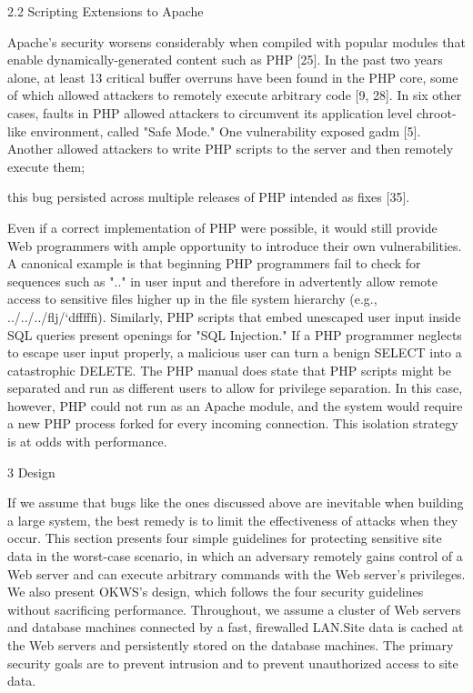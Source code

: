 2.2 Scripting Extensions to Apache

Apache's security worsens considerably when compiled with popular modules that
enable dynamically-generated content such as PHP [25].
In the past two years alone, at least 13 critical buffer overruns have been
found in the PHP core, some of which allowed attackers to remotely execute
arbitrary code [9, 28].
In six other cases, faults in PHP allowed attackers to circumvent its
application level chroot-like environment, called "Safe Mode." 
One vulnerability exposed gadm [5].
Another allowed attackers to write PHP scripts to the server and then remotely
execute them;

this bug persisted across multiple releases of PHP intended as fixes [35].

Even if a correct implementation of PHP were possible, it would still provide
Web programmers with ample opportunity to introduce their own vulnerabilities.
A canonical example is that beginning PHP programmers fail to check for
sequences such as ".." in user input and therefore in advertently allow remote
access to sensitive files higher up in the file system hierarchy
(e.g., ../../../\Phi flj/`dfffffi\Delta ). 
Similarly, PHP scripts that embed unescaped user input inside SQL queries
present openings for "SQL Injection." 
If a PHP programmer neglects to escape user input properly, a malicious user can
turn a benign SELECT into a catastrophic DELETE.
The PHP manual does state that PHP scripts might be separated and run as
different users to allow for privilege separation.
In this case, however, PHP could not run as an Apache module, and the system
would require a new PHP process forked for every incoming connection.
This isolation strategy is at odds with performance.

3 Design

If we assume that bugs like the ones discussed above are inevitable when
building a large system, the best remedy is to limit the effectiveness of
attacks when they occur.
This section presents four simple guidelines for protecting sensitive site data
in the worst-case scenario, in which an adversary remotely gains control of a
Web server and can execute arbitrary commands with the Web server's privileges.
We also present OKWS's design, which follows the four security guidelines
without sacrificing performance.
Throughout, we assume a cluster of Web servers and database machines connected
by a fast, firewalled LAN.Site data is cached at the Web servers and
persistently stored on the database machines.
The primary security goals are to prevent intrusion and to prevent unauthorized
access to site data.


